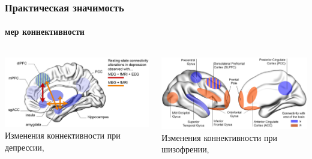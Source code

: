 \documentclass[12pt]{beamer}
\begin{document}
\begin{frame}[t]
    \frametitle{Практическая значимость}
    \framesubtitle{мер коннективности}

    \vspace{2cm}
    \begin{columns}
        \begin{column}{0.5\textwidth}
            \includegraphics[width=1\textwidth]{alterations1.png}
            {\tiny Изменения коннективности при депрессии, \cite{Alamian_front2017}}
        \end{column}
        \begin{column}{0.5\textwidth}
            \includegraphics[width=\textwidth]{alterations2.png}
            {\tiny Изменения коннективности при шизофрении, \cite{Alamian_clin2017}}
        \end{column}
        
    \end{columns}
\end{frame}
\end{document}
